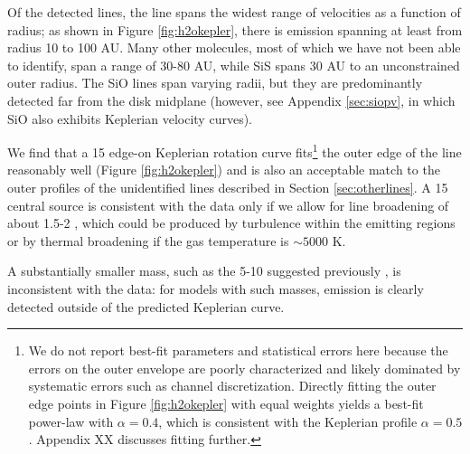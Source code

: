 \documentclass[twocolumn]{aastex61}
\begin{document}
Of the detected lines, the \water line spans the widest range of
velocities as a function of radius; as shown in Figure \ref{fig:h2okepler},
there is \water emission spanning at least from radius 10 to 100 AU.  Many
other molecules, most of
which we have not been able to identify, span a range of 30-80 AU, while SiS
spans 30 AU to an unconstrained outer radius.   The SiO lines span varying radii,
but they are predominantly detected far from the disk midplane (however,
see Appendix \ref{sec:siopv}, in which SiO also exhibits Keplerian velocity
curves).

We find that a 15 \msun edge-on Keplerian rotation curve fits\footnote{We do
not report best-fit parameters and statistical errors here because the errors
on the outer envelope are poorly characterized and likely dominated by
systematic errors such as channel discretization.  Directly fitting the outer
edge points in Figure \ref{fig:h2okepler} with equal weights yields a best-fit
power-law with $\alpha=0.4$, which is consistent with the Keplerian profile
$\alpha=0.5$.  Appendix XX discusses fitting further.} the outer edge of
the \water line reasonably well (Figure \ref{fig:h2okepler}) and is also an
acceptable match to the outer profiles of the unidentified lines
described in Section \ref{sec:otherlines}.  A 15 \msun central source is consistent
with the \water data only if we allow for line broadening of about 1.5-2 \kms,
which could be produced by turbulence within the emitting regions \citep[but
see][who observe stringent upper limits on turbulence in lower-mass
disks]{Flaherty2017a} or
by thermal broadening if the gas temperature is $\sim5000$ K.


A substantially smaller mass, such as the 5-10 \msun suggested previously
\citep{Plambeck2016a,Hirota2014a}, is inconsistent with the data: for models
with such masses, emission is clearly detected outside of the predicted
Keplerian curve.  
\end{document}
